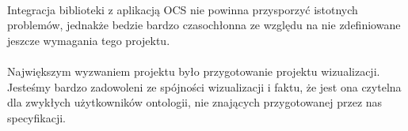 \documentclass[a4paper,10pt]{article}
\begin{document}
\paragraph{} Integracja biblioteki z aplikacją OCS nie powinna przysporzyć istotnych problemów, jednakże bedzie bardzo czasochłonna ze względu na nie zdefiniowane jeszcze wymagania tego projektu.
\paragraph{} Największym wyzwaniem projektu było przygotowanie projektu wizualizacji. Jesteśmy bardzo zadowoleni ze spójności wizualizacji i faktu, że jest ona czytelna dla zwykłych użytkowników ontologii, nie znających przygotowanej przez nas specyfikacji.
\end{document}
